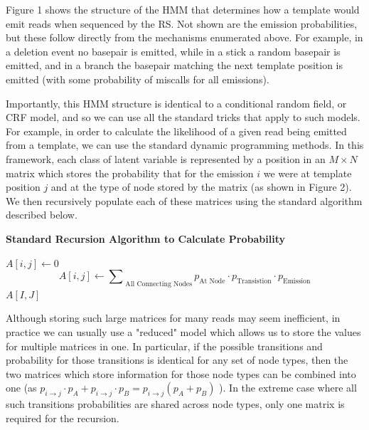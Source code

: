 \documentclass[fleqn,10pt]{SelfArx} %
\begin{document}
Figure 1 shows the structure of the HMM that determines how a template would emit reads when sequenced by the RS.  Not shown are the emission probabilities, but these follow directly from the mechanisms enumerated above.  For example, in a deletion event no basepair is emitted, while in a stick a random basepair is emitted, and in a branch the basepair matching the next template position is emitted (with some probability of miscalls for all emissions).   

Importantly, this HMM structure is identical to a conditional random field, or CRF model, and so we can use all the standard tricks that apply to such models.  For example, in order to calculate the likelihood of a given read being emitted from a template, we can use the standard dynamic programming methods.  In this framework, each class of latent variable is represented by a position in an $ M \times N$ matrix which stores the probability that for the emission $i$ we were at template position $j$ and at the type of node stored by the matrix (as shown in Figure 2).  We then recursively populate each of these matrices using the standard algorithm described below.

\begin{algorithm}
\caption*{\textbf{Standard Recursion Algorithm to Calculate Probability }}
\label{calcScore}
\begin{algorithmic}[h]
\STATE $A[i,j] \leftarrow 0$
\ELSE
\STATE \[
	A[i,j]  \leftarrow \sum\nolimits_{\text{ All Connecting Nodes} } p_{\text{At Node}} \cdot p_{\text{Transistion}} \cdot p_{\text{Emission}}
	\]
\ENDIF	
\ENDFOR
\ENDFOR
\RETURN $A[I,J]$
\end{algorithmic}
\end{algorithm}



Although storing such large matrices for many reads may seem inefficient, in practice we can usually use a "reduced" model which allows us to store the values for multiple matrices in one.  In particular, if the possible transitions and probability for those transitions is identical for any set of node types, then the two matrices which store information for those node types can be combined into one (as  $p_{i \rightarrow j} \cdot p_{A} + p_{i \rightarrow j} \cdot p_{B} = p_{i \rightarrow j} (p_{A} + p_{B})  $ ).  In the extreme case where all such transitions probabilities are shared across node types, only one matrix is required for the recursion.
\end{document}
